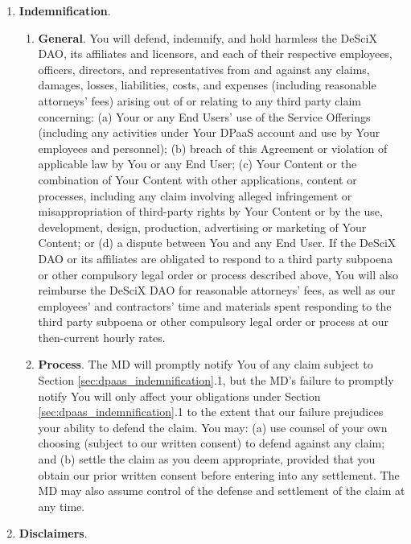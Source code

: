 \documentclass{article}
\begin{document}
\begin{enumerate}
    \item \textbf{Indemnification}. \label{sec:dpaas_indemnification}

    \begin{enumerate}
        \item \textbf{General}. You will defend, indemnify, and hold harmless the DeSciX DAO, its affiliates and licensors, and each of their respective employees, officers, directors, and representatives from and against any claims, damages, losses, liabilities, costs, and expenses (including reasonable attorneys’ fees) arising out of or relating to any third party claim concerning: (a) Your or any End Users’ use of the Service Offerings (including any activities under Your DPaaS account and use by Your employees and personnel); (b) breach of this Agreement or violation of applicable law by You or any End User; (c) Your Content or the combination of Your Content with other applications, content or processes, including any claim involving alleged infringement or misappropriation of third-party rights by Your Content or by the use, development, design, production, advertising or marketing of Your Content; or (d) a dispute between You and any End User. If the DeSciX DAO or its affiliates are obligated to respond to a third party subpoena or other compulsory legal order or process described above, You will also reimburse the DeSciX DAO for reasonable attorneys’ fees, as well as our employees’ and contractors’ time and materials spent responding to the third party subpoena or other compulsory legal order or process at our then-current hourly rates.
        
        \item \textbf{Process}. The MD will promptly notify You of any claim subject to Section \ref{sec:dpaas_indemnification}.1, but the MD's failure to promptly notify You will only affect your obligations under Section \ref{sec:dpaas_indemnification}.1 to the extent that our failure prejudices your ability to defend the claim. You may: (a) use counsel of your own choosing (subject to our written consent) to defend against any claim; and (b) settle the claim as you deem appropriate, provided that you obtain our prior written consent before entering into any settlement. The MD may also assume control of the defense and settlement of the claim at any time.
    \end{enumerate}

    \item \textbf{Disclaimers}. \label{sec:dpaas_disclaimers}


\end{enumerate}
\end{document}

